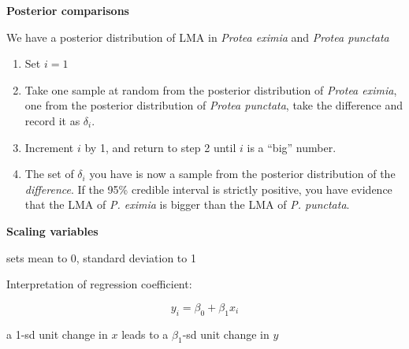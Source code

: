 \documentclass[titlepage,landscape,pdftex]{seminar}
\newcommand{\heading}[1]{{\color{red}\large\bf#1}}
\begin{document}
\begin{slide}
  \heading{Posterior comparisons}

  \noindent We have a posterior distribution of LMA in {\it Protea
    eximia\/} and {\it Protea punctata}

  \begin{enumerate}

    \item Set $i = 1$

    \item Take one sample at random from the posterior distribution of
      {\it Protea eximia\/}, one from the posterior distribution of
      {\it Protea punctata\/}, take the difference and record it as
      $\delta_i$.

    \item Increment $i$ by 1, and return to step 2 until $i$ is a
      ``big'' number.

    \item The set of $\delta_i$ you have is now a sample from the
      posterior distribution of the {\it difference}. If the 95\%
      credible interval is strictly positive, you have evidence that
      the LMA of {\it P. eximia\/} is bigger than the LMA of {\it
        P. punctata}. 

  \end{enumerate}

  \vfill
  
\end{slide}

\begin{slide}
  \heading{Scaling variables}

   sets mean to 0, standard deviation to 1

  \noindent Interpretation of regression coefficient:

  $$
  y_i = \beta_0 + \beta_1 x_i
  $$
  
  a 1-sd unit change in $x$ leads to a $\beta_1$-sd unit change in $y$

\end{slide}
\end{document}
